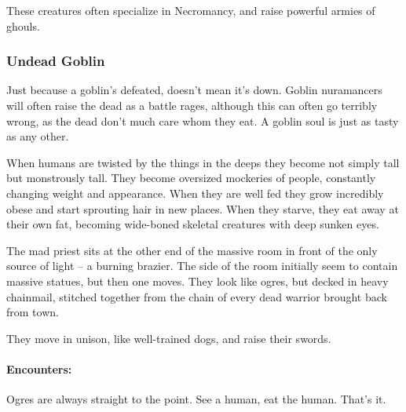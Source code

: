 \begin{multicols}{2}
These creatures often specialize in Necromancy, and raise powerful armies of ghouls.



\subsubsection{Undead Goblin}

Just because a goblin's defeated, doesn't mean it's down.
Goblin nuramancers will often raise the dead as a battle rages, although this can often go terribly wrong, as the dead don't much care whom they eat.
A goblin soul is just as tasty as any other.



\label{ogre}

When humans are twisted by the things in the deeps they become not simply tall but monstrously tall.
They become oversized mockeries of people, constantly changing weight and appearance.
When they are well fed they grow incredibly obese and start sprouting hair in new places.
When they starve, they eat away at their own fat, becoming wide-boned skeletal creatures with deep sunken eyes.


\begin{boxtext}

	The mad priest sits at the other end of the massive room in front of the only source of light -- a burning brazier.
	The side of the room initially seem to contain massive statues, but then one moves.
	They look like ogres, but decked in heavy chainmail, stitched together from the chain of every dead warrior brought back from town.

	They move in unison, like well-trained dogs, and raise their swords.

\end{boxtext}

\paragraph{Encounters:}

Ogres are always straight to the point.
See a human, eat the human.
That's it.

\end{multicols}

